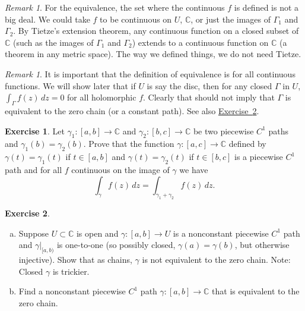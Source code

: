 \documentclass[12pt,openany]{book}
\newcommand{\C}{{\mathbb{C}}}
\theoremstyle{plain}
\theoremstyle{remark}
\newtheorem{remark}[thm]{Remark}
\theoremstyle{definition}
\newenvironment{exbox}{%
    \def\FrameCommand{\vrule width 1pt \relax\hspace {10pt}}%
    \MakeFramed {\advance \hsize -\width \FrameRestore }%
}{%
    \endMakeFramed
}
\newenvironment{exparts}{%
    \leavevmode\begin{enumerate}[a),noitemsep,topsep=0pt,parsep=0pt,partopsep=0pt]
}{%
    \end{enumerate}
}
\theoremstyle{exercise}
\newtheorem{exercise}{Exercise}[section]
\theoremstyle{example}
\newcommand{\exerciseref}[1]{\hyperref[#1]{Exercise~\ref*{#1}}}
\begin{document}
\begin{remark}
For the equivalence,
the set where the continuous $f$ is defined is not a big deal.  We could
take $f$ to be continuous on $U$, $\C$, or just the images of
$\Gamma_1$ and $\Gamma_2$.
By Tietze's extension theorem, any continuous function on a closed subset of
$\C$ (such as the images of $\Gamma_1$ and $\Gamma_2$) extends to a
continuous function on $\C$ (a theorem in any metric space).
The way we defined things, we do not need Tietze.
\end{remark}

\begin{remark}
It is important that the definition of equivalence is for all continuous
functions.  We will show later that if $U$ is say the disc, then for
any closed $\Gamma$ in $U$, $\int_\Gamma f(z) \, dz = 0$ for all holomorphic $f$.
Clearly that should not imply that $\Gamma$ is equivalent to the zero chain
(or a constant path).  See also \exerciseref{exercise:nonconstantnonzerochain}.
\end{remark}

\begin{exbox}
\begin{exercise} \label{exercise:pathsum}
Let $\gamma_1 \colon [a,b] \to \C$ and $\gamma_2 \colon [b,c] \to \C$
be two piecewise $C^1$ paths and $\gamma_1(b)=\gamma_2(b)$.
Prove that the function $\gamma \colon [a,c] \to
\C$ defined by $\gamma(t) = \gamma_1(t)$ if $t \in [a,b]$ and $\gamma(t)
= \gamma_2(t)$ if $t \in [b,c]$ is a piecewise $C^1$ path and
for all $f$ continuous on the image of $\gamma$ we have
\begin{equation*}
\int_{\gamma} f(z)\,dz = \int_{\gamma_1 + \gamma_2} f(z) \, dz .
\end{equation*}
\end{exercise}

\begin{exercise} \label{exercise:nonconstantnonzerochain}
\begin{exparts}
\item
Suppose $U \subset \C$ is open and
$\gamma \colon [a,b] \to U$
is a nonconstant piecewise $C^1$
path and $\gamma|_{[a,b)}$ is one-to-one (so possibly closed,
$\gamma(a)=\gamma(b)$,
but otherwise injective).  Show that as chains, $\gamma$ is not equivalent to the zero chain.
Note: Closed $\gamma$ is trickier.
\item
Find a nonconstant piecewise $C^1$ path $\gamma \colon [a,b] \to \C$ that is
equivalent to the zero chain.
\end{exparts}
\end{exercise}
\end{exbox}
\end{document}
